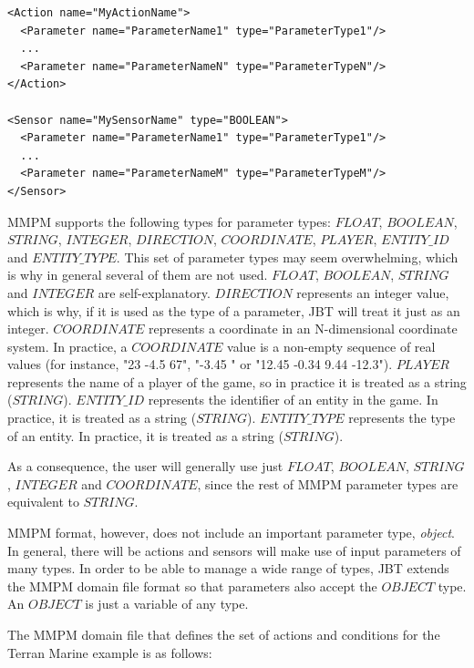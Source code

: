 \documentclass[a4paper]{article}
\begin{document}
\begin{verbatim}
<Action name="MyActionName">
  <Parameter name="ParameterName1" type="ParameterType1"/>
  ...
  <Parameter name="ParameterNameN" type="ParameterTypeN"/>
</Action>

<Sensor name="MySensorName" type="BOOLEAN">
  <Parameter name="ParameterName1" type="ParameterType1"/>
  ...
  <Parameter name="ParameterNameM" type="ParameterTypeM"/>
</Sensor>
\end{verbatim}

MMPM supports the following types for parameter types: $FLOAT$, $BOOLEAN$, $STRING$, $INTEGER$, $DIRECTION$, $COORDINATE$, $PLAYER$, $ENTITY\_ID$ and $ENTITY\_TYPE$. This set of parameter types may seem overwhelming, which is why in general several of them are not used. $FLOAT$, $BOOLEAN$, $STRING$ and $INTEGER$ are self-explanatory. $DIRECTION$ represents an integer value, which is why, if it is used as the type of a parameter, JBT will treat it just as an integer. $COORDINATE$ represents a coordinate in an N-dimensional coordinate system. In practice, a $COORDINATE$ value is a non-empty sequence of real values (for instance, "23 -4.5 67", "-3.45 " or "12.45 -0.34 9.44 -12.3"). $PLAYER$ represents the name of a player of the game, so in practice it is treated as a string ($STRING$). $ENTITY\_ID$ represents the identifier of an entity in the game. In practice, it is treated as a string ($STRING$). $ENTITY\_TYPE$ represents the type of an entity. In practice, it is treated as a string ($STRING$).

As a consequence, the user will generally use just $FLOAT$, $BOOLEAN$, $STRING$, $INTEGER$ and $COORDINATE$, since the rest of MMPM parameter types are equivalent to $STRING$.

MMPM format, however, does not include an important parameter type, \textit{object}. In general, there will be actions and sensors will make use of input parameters of many types. In order to be able to manage a wide range of types, JBT extends the MMPM domain file format so that parameters also accept the $OBJECT$ type. An $OBJECT$ is just a variable of any type.

The MMPM domain file that defines the set of actions and conditions for the Terran Marine example is as follows:
\end{document}
